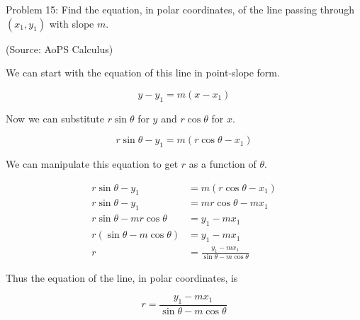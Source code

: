 Problem 15: Find the equation, in polar coordinates, of the line passing through $(x_1, y_1)$ with slope $m$.

(Source: AoPS Calculus)

We can start with the equation of this line in point-slope form.

$$ y - y_1 = m(x - x_1) $$

Now we can substitute $r \sin \theta$ for $y$ and $r \cos \theta$ for $x$.

$$ r \sin \theta - y_1 = m(r \cos \theta - x_1) $$

We can manipulate this equation to get $r$ as a function of $\theta$.

\begin{align*}
r \sin \theta - y_1 &= m(r \cos \theta - x_1) \\
r \sin \theta - y_1 &= mr \cos \theta - m x_1 \\
r \sin \theta - mr \cos \theta &= y_1 - m x_1 \\
r \left(\sin \theta - m \cos \theta\right) &= y_1 - m x_1 \\
r &= \frac{y_1 - m x_1}{\sin \theta - m \cos \theta}
\end{align*}

Thus the equation of the line, in polar coordinates, is

$$ \boxed{r = \frac{y_1 - m x_1}{\sin \theta - m \cos \theta}} $$
